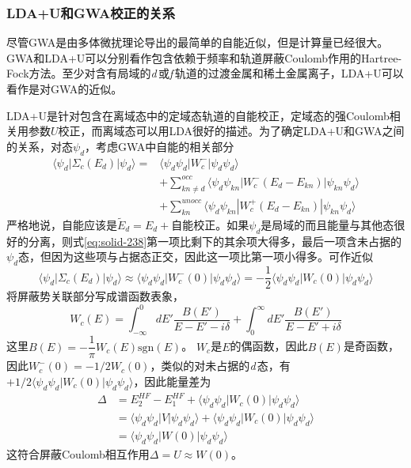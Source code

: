 \subsubsection{LDA+U和GWA校正的关系}
尽管GWA是由多体微扰理论导出的最简单的自能近似，但是计算量已经很大。GWA和LDA+U可以分别看作包含依赖于频率和轨道屏蔽Coulomb作用的Hartree-Fock方法。至少对含有局域的{\it d}\,或{\it f}\,轨道的过渡金属和稀土金属离子，LDA+U可以看作是对GWA的近似\cite{JPCM9-767_1997}。

LDA+U是针对包含在离域态中的定域态轨道的自能校正，定域态的强Coulomb相关用参数$U$校正，而离域态可以用LDA很好的描述。为了确定LDA+U和GWA之间的关系，对态$\psi_d$，考虑GWA中自能的相关部分
\begin{equation}
  \begin{split}
    \langle\psi_d|\Sigma_c(E_d)|\psi_d\rangle=&\langle\psi_d\psi_d|W_c^-|\psi_d\psi_d\rangle\\
    &+\sum_{kn\neq d}^{occ}\langle\psi_d\psi_{kn}|W_c^-(E_d-E_{kn})|\psi_{kn}\psi_d\rangle\\
    &+\sum_{kn}^{unocc}\langle\psi_d\psi_{kn}|W_c^+(E_d-E_{kn})|\psi_{kn}\psi_d\rangle
  \end{split}
  \label{eq:solid-238}
\end{equation}
严格地说，自能应该是$\tilde E_d=E_d+$自能校正。如果$\psi_d$是局域的而且能量与其他态很好的分离，则式\eqref{eq:solid-238}第一项比剩下的其余项大得多，最后一项含未占据的$\psi_d$态，但因为这些项与占据态正交，因此这一项比第一项小得多。可作近似\cite{JPCM9-767_1997}
\begin{equation}
  \langle\psi_d|\Sigma_c(E_d)|\psi_d\rangle\approx\langle\psi_d\psi_d|W_c^-(0)|\psi_d\psi_d\rangle=-\frac12\langle\psi_d\psi_d|W_c(0)|\psi_d\psi_d\rangle
  \label{eq:solid-239}
\end{equation}
将屏蔽势关联部分写成谱函数表象，
\begin{equation}
  W_c(E)=\int_{-\infty}^0dE'\frac{B(E')}{E-E'-i\delta}+\int_0^{\infty}dE'\frac{B(E')}{E-E'+i\delta}
  \label{eq:solid-240}
\end{equation}
这里$B(E)=-\dfrac1{\pi}W_c(E)\mathrm{sgn}(E)$。
$W_c$是$E$的偶函数，因此$B(E)$是奇函数，因此$W_c^-(0)=-1/2W_c(0)$，类似的对未占据的{\it d}\,态，有$+1/2\langle\psi_d\psi_d|W_c(0)|\psi_d\psi_d\rangle$，因此能量差为
\begin{equation}
  \begin{split}
    \Delta&=E_2^{HF}-E_1^{HF}+\langle\psi_d\psi_d|W_c(0)|\psi_d\psi_d\rangle\\
    &=\langle\psi_d\psi_d|V|\psi_d\psi_d\rangle+\langle\psi_d\psi_d|W_c(0)|\psi_d\psi_d\rangle\\
    &=\langle\psi_d\psi_d|W(0)|\psi_d\psi_d\rangle
  \end{split}
  \label{eq:solid-241}
\end{equation}
这符合屏蔽Coulomb相互作用$\Delta=U\approx W(0)$。

